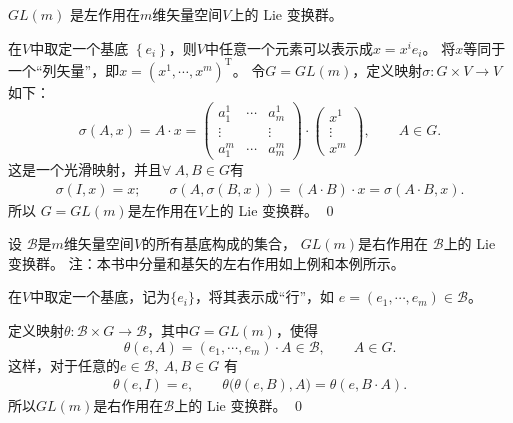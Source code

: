 \begin{example}\label{chlg:exm_GLonV}
    $ GL(m)$ 是左作用在$m$维矢量空间$V$上的 Lie 变换群。
\end{example}

在$V$中取定一个基底 $\left\{e_i\right\}$，则$V$中任意一个元素可以表示成$x= x^i e_i$。
将$x$等同于一个“列矢量”，即$x=\left(x^1, \cdots, x^m\right)^{\mathrm{T}}$。
令$G=GL(m)$，定义映射$\sigma: G \times V \rightarrow V$ 如下：
\begin{equation*}
    \sigma(A, x)=A \cdot x=\left(\begin{array}{ccc}
        a_1^1 & \cdots & a_m^1 \\
        \vdots & & \vdots \\
        a_1^m & \cdots & a_m^m
    \end{array}\right) \cdot\left(\begin{array}{c}
        x^1 \\
        \vdots \\
        x^m
    \end{array}\right) ,\qquad A\in G.
\end{equation*}
这是一个光滑映射，并且$\forall \ A, B \in G$有
\begin{align*}
    \sigma(I, x)=x; \qquad
    \sigma(A, \sigma(B, x))=(A \cdot B) \cdot x=\sigma(A \cdot B, x).
\end{align*}
所以 $G=GL(m)$是左作用在$V$上的 Lie 变换群。
\qed

\begin{example}\label{chlg:exm_GLonB}
    设 $\mathscr{B}$是$m$维矢量空间$V$的所有基底构成的集合，
    $GL(m)$是右作用在 $\mathscr{B}$上的 Lie 变换群。
    注：本书中分量和基矢的左右作用如上例和本例所示。
\end{example}

在$V$中取定一个基底，记为$\{e_i\}$，将其表示成“行”，如
$e=\left(e_1, \cdots, e_m\right) \in \mathscr{B}$。

定义映射$\theta: \mathscr{B} \times G \rightarrow \mathscr{B}$，其中$G=GL(m)$，使得
\begin{equation*}
    \theta(e, A)=\left(e_1, \cdots,
    e_m\right) \cdot A \in \mathscr{B},\qquad A\in G .
\end{equation*}
这样，对于任意的$e \in \mathscr{B},\ A, B \in G$ 有
\begin{align*}
    \theta(e, I) =e, \qquad
    \theta\bigl(\theta(e, B), A\bigr)
    =\theta(e, B \cdot A).
\end{align*}
所以$GL(m)$是右作用在$\mathscr{B}$上的 Lie 变换群。
\qed

